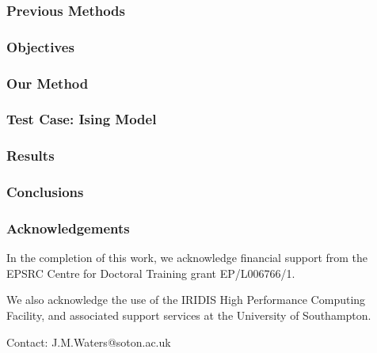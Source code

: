 \documentclass{beamer}
\begin{document}
\begin{frame}
	\frametitle{Previous Methods}
\end{frame}

\begin{frame}
	\frametitle{Objectives}
\end{frame}

\begin{frame}
	\frametitle{Our Method}
\end{frame}

\begin{frame}
	\frametitle{Test Case: Ising Model}
\end{frame}

\begin{frame}
	\frametitle{Results}
\end{frame}

\begin{frame}
	\frametitle{Conclusions}
\end{frame}

\begin{frame}
	\frametitle{Acknowledgements}
	In the completion of this work, we acknowledge financial support from the EPSRC Centre for Doctoral Training grant EP/L006766/1. \newline
	
	We also acknowledge the use of the IRIDIS High Performance Computing Facility, and associated support services at the University of
Southampton. \newline

	Contact: J.M.Waters@soton.ac.uk
\end{frame}
\end{document}
